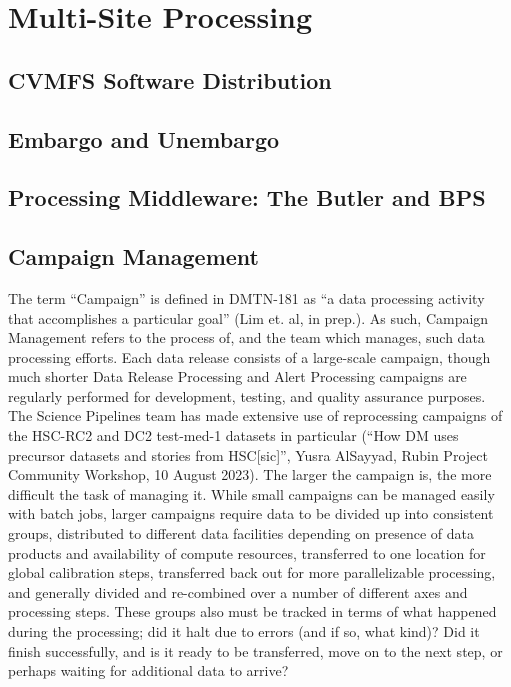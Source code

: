 \section{Multi-Site Processing}
	\subsection{CVMFS Software Distribution}
	\subsection{Embargo and Unembargo}
        \subsection{Processing Middleware: The Butler and BPS}
	\subsection{Campaign Management}
		The term ``Campaign'' is defined in DMTN-181 as ``a data processing activity that accomplishes a particular goal'' (Lim et. al, in prep.). As such, Campaign Management refers to the process of, and the team which manages, such data processing efforts.
		Each data release consists of a large-scale campaign, though much shorter Data Release Processing and Alert Processing campaigns are regularly performed for development, testing, and quality assurance purposes.
		The Science Pipelines team has made extensive use of reprocessing campaigns of the HSC-RC2 and DC2 test-med-1 datasets in particular (``How DM uses precursor datasets and stories from HSC[sic]'', Yusra AlSayyad, Rubin Project Community Workshop, 10 August 2023).
		The larger the campaign is, the more difficult the task of managing it.
		While small campaigns can be managed easily with batch jobs, larger campaigns require data to be divided up into consistent groups, distributed to different data facilities depending on presence of data products and availability of compute resources, transferred to one location for global calibration steps, transferred back out for more parallelizable processing, and generally divided and re-combined over a number of different axes and processing steps.
		These groups also must be tracked in terms of what happened during the processing; did it halt due to errors (and if so, what kind)? Did it finish successfully, and is it ready to be transferred, move on to the next step, or perhaps waiting for additional data to arrive?

